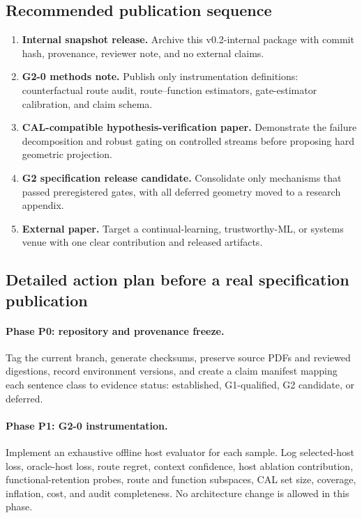 \documentclass[11pt,a4paper]{article}
\begin{document}
\subsection{Recommended publication sequence}
\begin{enumerate}
\item \textbf{Internal snapshot release.} Archive this v0.2-internal package with commit hash, provenance, reviewer note, and no external claims.
\item \textbf{G2-0 methods note.} Publish only instrumentation definitions: counterfactual route audit, route--function estimators, gate-estimator calibration, and claim schema.
\item \textbf{CAL-compatible hypothesis-verification paper.} Demonstrate the failure decomposition and robust gating on controlled streams before proposing hard geometric projection.
\item \textbf{G2 specification release candidate.} Consolidate only mechanisms that passed preregistered gates, with all deferred geometry moved to a research appendix.
\item \textbf{External paper.} Target a continual-learning, trustworthy-ML, or systems venue with one clear contribution and released artifacts.
\end{enumerate}

\subsection{Detailed action plan before a real specification publication}
\paragraph{Phase P0: repository and provenance freeze.}
Tag the current branch, generate checksums, preserve source PDFs and reviewed digestions, record environment versions, and create a claim manifest mapping each sentence class to evidence status: established, G1-qualified, G2 candidate, or deferred.

\paragraph{Phase P1: G2-0 instrumentation.}
Implement an exhaustive offline host evaluator for each sample. Log selected-host loss, oracle-host loss, route regret, context confidence, host ablation contribution, functional-retention probes, route and function subspaces, CAL set size, coverage, inflation, cost, and audit completeness. No architecture change is allowed in this phase.
\end{document}
